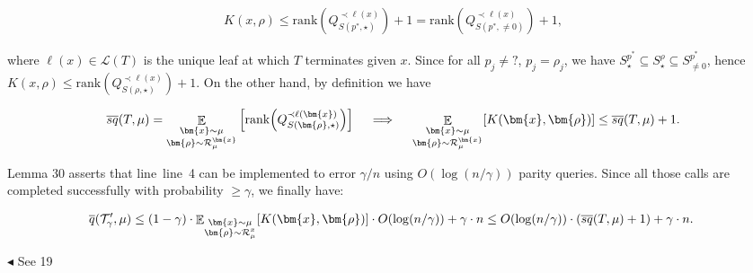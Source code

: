 \documentclass[10pt,a4paper]{article}
\begin{document}
\[\begin{gathered}
K(x,\rho)\leq\mathrm{rank}\left(Q^{\prec\ell(x)}_{S(p^{*},\star)}\right)+1=\mathrm{rank}\left(Q^{\prec\ell(x)}_{S(p^{*},\neq 0)}\right)+1,
\end{gathered}\]


where $\ell(x)\in\mathcal{L}(T)$ is the unique leaf at which $T$ terminates given $x$. Since for all $p_{j}\neq?$, $p_{j}=\rho_{j}$, we have $S^{p^{*}}_{\star}\subseteq S^{\rho}_{\star}\subseteq S^{p^{*}}_{\neq 0}$, hence $K(x,\rho)\leq\mathrm{rank}(Q^{\prec\ell(x)}_{S(\rho,\star)})+1$.
On the other hand, by definition we have\par


\[\begin{gathered}
\mathop{\overline{sq}}(T,\mu)=\mathop{\mathbb{E}}_{\begin{subarray}{c}\bm{x}\sim\mu\\
\bm{\rho}\sim\mathcal{R}_{\mu}^{\bm{x}}\end{subarray}}\Big{[}\mathrm{rank}\Big{(}Q^{\prec\ell(\bm{x})}_{S(\bm{\rho},\star)}\Big{)}\Big{]}\quad\implies\quad\mathop{\mathbb{E}}_{\begin{subarray}{c}\bm{x}\sim\mu\\
\bm{\rho}\sim\mathcal{R}_{\mu}^{\bm{x}}\end{subarray}}[K(\bm{x},\bm{\rho})]\leq\mathop{\overline{sq}}(T,\mu)+1.
\end{gathered}\]


Lemma 30 asserts that line line 4 can be implemented to error $\gamma/n$ using $O(\log(n/\gamma))$ parity queries. Since all those calls are completed successfully with probability $\geq\gamma$, we finally have:\par


\[\begin{gathered}
\overline{q}(\mathcal{T}^{\prime}_{\gamma},\mu)\leq(1-\gamma)\cdot\mathop{\mathbb{E}}\nolimits_{\begin{subarray}{c}\bm{x}\sim\mu\\
\bm{\rho}\sim\mathcal{R}_{\mu}^{x}\end{subarray}}[K(\bm{x},\bm{\rho})]\cdot O(\log(n/\gamma))+\gamma\cdot n\leq O(\log(n/\gamma))\cdot(\mathop{\overline{sq}}(T,\mu)+1)+\gamma\cdot n.\
\end{gathered}\]


$\blacktriangleleft$
See 19\par
\end{document}
